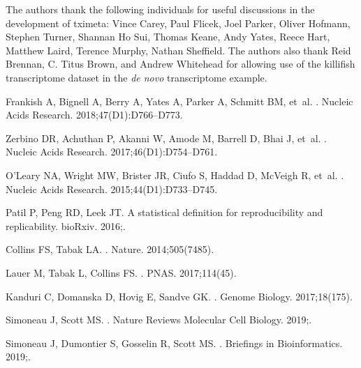 \documentclass[10pt,letterpaper]{article}
\begin{document}
The authors thank the following individuals for useful discussions
in the development of tximeta: Vince Carey, Paul Flicek, Joel Parker,
Oliver Hofmann, Stephen Turner, Shannan Ho Sui, Thomas Keane, Andy
Yates, Reece Hart, Matthew Laird, Terence Murphy, Nathan Sheffield.
The authors also thank Reid Brennan, C. Titus Brown, and Andrew
Whitehead for allowing use of the killifish transcriptome dataset in
the \textit{de novo} transcriptome example.

\nolinenumbers

\begin{thebibliography}{10}

Frankish A, Bignell A, Berry A, Yates A, Parker A, Schmitt BM, et~al.
.
\newblock Nucleic Acids Research. 2018;47(D1):D766--D773.

Zerbino DR, Achuthan P, Akanni W, Amode M, Barrell D, Bhai J, et~al.
.
\newblock Nucleic Acids Research. 2017;46(D1):D754--D761.

O'Leary NA, Wright MW, Brister JR, Ciufo S, Haddad D, McVeigh R, et~al.
.
\newblock Nucleic Acids Research. 2015;44(D1):D733--D745.

Patil P, Peng RD, Leek JT.
\newblock A statistical definition for reproducibility and replicability.
\newblock bioRxiv. 2016;.

Collins FS, Tabak LA.
.
\newblock Nature. 2014;505(7485).

Lauer M, Tabak L, Collins FS.
.
\newblock PNAS. 2017;114(45).

Kanduri C, Domanska D, Hovig E, Sandve GK.
.
\newblock Genome Biology. 2017;18(175).

Simoneau J, Scott MS.
.
\newblock Nature Reviews Molecular Cell Biology. 2019;.

Simoneau J, Dumontier S, Gosselin R, Scott MS.
.
\newblock Briefings in Bioinformatics. 2019;.


\end{thebibliography}
\end{document}
